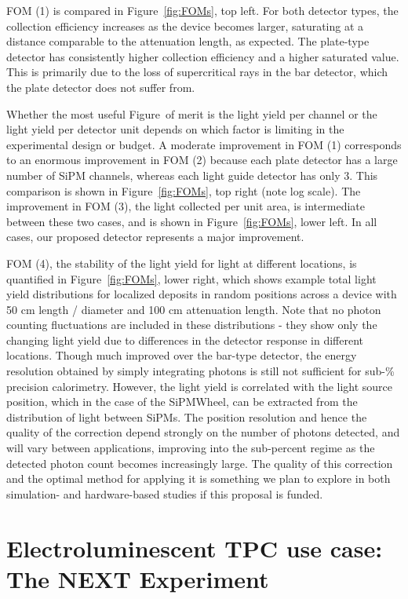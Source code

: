 FOM (1) is compared in Figure~\ref{fig:FOMs}, top left.   For both detector types, the collection efficiency increases as the device becomes larger, saturating at a distance comparable to the attenuation length, as expected.   The plate-type detector has consistently higher collection efficiency and a higher saturated value.  This is primarily due to the loss of supercritical rays in the bar detector, which the plate detector does not suffer from.

Whether the most useful Figure~of merit is the light yield per channel or the light yield per detector unit depends on which factor is limiting in the experimental design or budget.  A moderate improvement in FOM (1) corresponds to an enormous improvement in FOM (2) because each plate detector has a large number of SiPM channels, whereas each light guide detector has only 3. This comparison is shown in Figure~\ref{fig:FOMs}, top right (note log scale).  The improvement in FOM (3), the light collected per unit area, is intermediate between these two cases, and is shown in Figure~\ref{fig:FOMs}, lower left.  In all cases, our proposed detector represents a major improvement.

FOM (4), the stability of the light yield for light at different locations, is quantified in Figure~\ref{fig:FOMs}, lower right, which shows example total light yield distributions for localized deposits in random positions across a device with 50 cm length / diameter and 100 cm attenuation length.   Note that no photon counting fluctuations are included in these distributions - they show only the changing light yield due to differences in the detector response in different locations.  Though much improved over the bar-type detector, the energy resolution obtained by simply integrating photons is still not sufficient for sub-\% precision calorimetry.  However, the light yield is correlated with the light source position, which in the case of the SiPMWheel, can be extracted from the distribution of light between SiPMs.  The position resolution and hence the quality of the correction depend strongly on the number of photons detected, and will vary between applications, improving into the sub-percent regime as the detected photon count becomes increasingly large.  The quality of this correction and the optimal method for applying it is something we plan to explore in both simulation- and hardware-based studies if this proposal is funded.




\section{Electroluminescent TPC use case: The NEXT Experiment}

